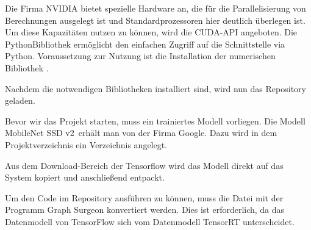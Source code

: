 \medskip



\medskip


Die Firma NVIDIA bietet spezielle Hardware an, die für die Parallelisierung von Berechnungen ausgelegt ist
und Standardprozessoren hier deutlich überlegen ist. Um diese Kapazitäten nutzen zu können, wird die
CUDA-API angeboten. Die PythonBibliothek  ermöglicht den einfachen Zugriff auf die Schnittstelle
via Python. Voraussetzung zur Nutzung ist die Installation der numerischen Bibliothek .

\medskip 


\medskip

Nachdem die notwendigen Bibliotheken installiert sind, wird nun  das 
Repository geladen. 


\medskip


\medskip

Bevor wir das Projekt starten, muss ein trainiertes Modell vorliegen. Die Modell \glqq MobileNet SSD v2\grqq{}\,
erhält man von der Firma Google.
Dazu wird in dem Projektverzeichnis ein Verzeichnis  angelegt.


\medskip




\medskip

Aus dem Download-Bereich der Tensorflow wird das Modell direkt auf das System kopiert und anschließend
entpackt.

\medskip





\medskip


Um den Code im Repository ausführen zu können, muss die Datei 
mit der Programm  Graph Surgeon konvertiert werden. Dies ist erforderlich, da das 
Datenmodell von TensorFlow sich vom Datenmodell TensorRT unterscheidet. \cite{TensorRT:2020}

